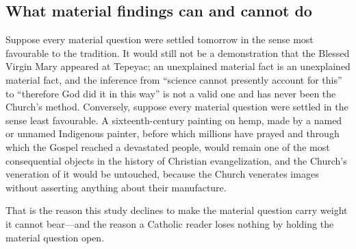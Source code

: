 \subsection{What material findings can and cannot do}

Suppose every material question were settled tomorrow in the sense
most favourable to the tradition. It would still not be a
demonstration that the Blessed Virgin Mary appeared at Tepeyac; an
unexplained material fact is an unexplained material fact, and the
inference from ``science cannot presently account for this'' to
``therefore God did it in this way'' is not a valid one and has never
been the Church's method. Conversely, suppose every material question
were settled in the sense least favourable. A sixteenth-century
painting on hemp, made by a named or unnamed Indigenous painter,
before which millions have prayed and through which the Gospel
reached a devastated people, would remain one of the most
consequential objects in the history of Christian evangelization, and
the Church's veneration of it would be untouched, because the Church
venerates images without asserting anything about their manufacture.

That is the reason this study declines to make the material question
carry weight it cannot bear---and the reason a Catholic reader loses
nothing by holding the material question open.
